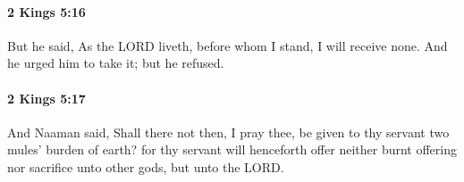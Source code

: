 		\paragraph{2 Kings 5:16} %
			\label{2KINGS-5-16}

			But he said, As the LORD liveth, before whom I stand, I will receive none. And he urged him to take it; but he refused.


		\paragraph{2 Kings 5:17} %
			\label{2KINGS-5-17}

			And Naaman said, Shall there not then, I pray thee, be given to thy servant two mules’ burden of earth? for thy servant will henceforth offer neither burnt offering nor sacrifice unto other gods, but unto the LORD.


